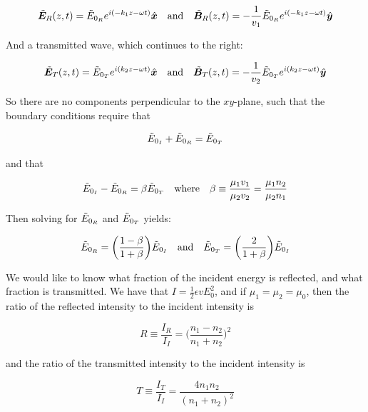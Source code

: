 \documentclass[a4paper]{article}
\begin{document}
\begin{align*}
    \Tilde{\bm{E}}_R(z, t) = \Tilde{E}_{0_{R}}e^{i(-k_1z-\omega t)}\hat{\bm{x}}\quad\text{and}\quad
    \Tilde{\bm{B}}_R(z, t) = -\frac{1}{v_1}\Tilde{E}_{0_{R}}e^{i(-k_1z-\omega t)}\hat{\bm{y}}
\end{align*}

And a transmitted wave, which continues to the right:

\begin{align*}
    \Tilde{\bm{E}}_T(z, t) = \Tilde{E}_{0_{T}}e^{i(k_2z-\omega t)}\hat{\bm{x}}\quad\text{and}\quad
    \Tilde{\bm{B}}_T(z, t) = -\frac{1}{v_2}\Tilde{E}_{0_{T}}e^{i(k_2z-\omega t)}\hat{\bm{y}}
\end{align*}

So there are no components perpendicular to the $xy$-plane, such that the boundary conditions require that

\begin{equation*}
    \Tilde{E}_{0_{I}}+\Tilde{E}_{0_{R}}=\Tilde{E}_{0_{T}}
\end{equation*}

and that

\begin{equation*}
    \Tilde{E}_{0_{I}}-\Tilde{E}_{0_{R}}=\beta\Tilde{E}_{0_{T}}\quad\text{where}\quad \beta\equiv\frac{\mu_1v_1}{\mu_2v_2}=\frac{\mu_1n_2}{\mu_2n_1}
\end{equation*}

Then solving for $\Tilde{E}_{0_{R}}$ and $\Tilde{E}_{0_{T}}$ yields:

\begin{equation*}
    \Tilde{E}_{0_{R}}=\bigg(\frac{1-\beta}{1+\beta}\bigg)\Tilde{E}_{0_{I}}\quad\text{and}\quad\Tilde{E}_{0_{T}}=\bigg(\frac{2}{1+\beta}\bigg)\Tilde{E}_{0_{I}}
\end{equation*}

We would like to know what fraction of the incident energy is reflected, and what fraction is transmitted. We have that $I=\frac{1}{2}\epsilon vE_0^2$, and if $\mu_1=\mu_2=\mu_0$, then the ratio of the reflected intensity to the incident intensity is

\begin{equation*}
    R\equiv\frac{I_R}{I_I}=\bigg(\frac{n_1-n_2}{n_1+n_2}\bigg)^2
\end{equation*}

and the ratio of the transmitted intensity to the incident intensity is

\begin{equation*}
    T\equiv\frac{I_T}{I_I}=\frac{4n_1n_2}{(n_1+n_2)^2}
\end{equation*}
\end{document}
